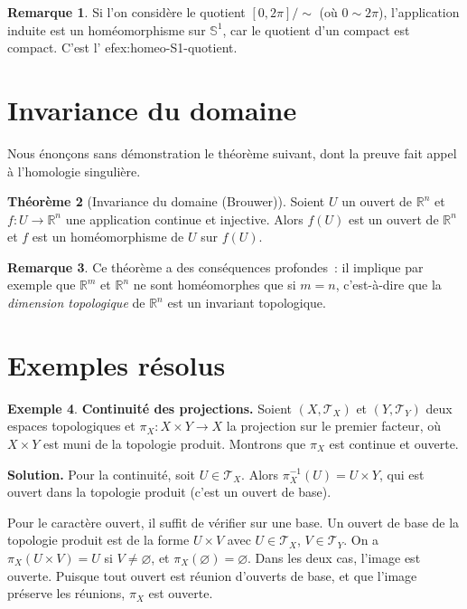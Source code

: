 \documentclass[12pt,a4paper,openany]{book}
\theoremstyle{definition}
\theoremstyle{cours}
\newtheorem{theoreme}{Théorème}[chapter]
\theoremstyle{coursnormal}
\newtheorem{remarque}[theoreme]{Remarque}
\newtheorem{exemple}[theoreme]{Exemple}
\newcommand{\R}{\mathbb{R}}
\newcommand{\T}{\mathcal{T}}
\begin{document}
\begin{remarque}
  Si l'on considère le quotient $[0,2\pi]/\!\!\sim$ (où $0\sim 2\pi$),
  l'application induite est un homéomorphisme sur $\mathbb{S}^1$, car le
  quotient d'un compact est compact. C'est l'
ef{ex:homeo-S1-quotient}.
\end{remarque}

\section{Invariance du domaine}\label{sec:invariance-domaine}

Nous énonçons sans démonstration le théorème suivant, dont la preuve fait appel
à l'homologie singulière.

\begin{theoreme}[Invariance du domaine (Brouwer)]\label{thm:invariance-domaine}
  Soient $U$ un ouvert de $\R^n$ et $f\colon U\to\R^n$ une application
  continue et injective. Alors $f(U)$ est un ouvert de
  $\R^n$ et $f$ est un homéomorphisme de $U$
  sur $f(U)$.
\end{theoreme}

\begin{remarque}
  Ce théorème a des conséquences profondes~: il implique par exemple que $\R^m$
  et $\R^n$ ne sont homéomorphes que si $m=n$, c'est-à-dire que la
  \emph{dimension topologique} de $\R^n$ est un invariant topologique.
\end{remarque}

\section{Exemples résolus}\label{sec:exemples-resolus-ch4}

\begin{exemple}\label{ex:continuite-projections}
  \textbf{Continuité des projections.}
  Soient $(X,\T_X)$ et $(Y,\T_Y)$ deux espaces topologiques et
  $\pi_X\colon X\times Y\to X$ la projection sur le premier facteur, où
  $X\times Y$ est muni de la topologie produit. Montrons que $\pi_X$ est
  continue et ouverte.

  \textbf{Solution.} Pour la continuité, soit $U\in\T_X$. Alors
  $\pi_X^{-1}(U) = U\times Y$, qui est ouvert dans la topologie produit
  (c'est un ouvert de base).

  Pour le caractère ouvert, il suffit de vérifier sur une base. Un ouvert de
  base de la topologie produit est de la forme $U\times V$ avec $U\in\T_X$,
  $V\in\T_Y$. On a $\pi_X(U\times V)=U$ si $V\neq\varnothing$, et
  $\pi_X(\varnothing)=\varnothing$. Dans les deux cas, l'image est ouverte.
  Puisque tout ouvert est réunion d'ouverts de base, et que l'image préserve
  les réunions, $\pi_X$ est ouverte.
\end{exemple}
\end{document}
